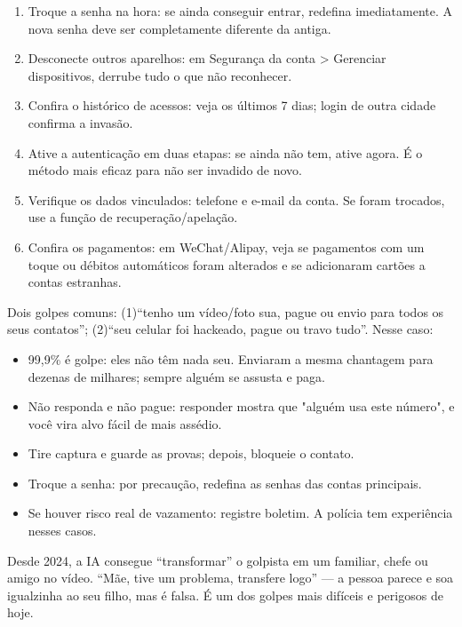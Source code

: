 
\begin{enumerate}
  \item Troque a senha na hora: se ainda conseguir entrar, redefina imediatamente. A nova senha deve ser completamente diferente da antiga.
  \item Desconecte outros aparelhos: em Segurança da conta > Gerenciar dispositivos, derrube tudo o que não reconhecer.
  \item Confira o histórico de acessos: veja os últimos 7 dias; login de outra cidade confirma a invasão.
  \item Ative a autenticação em duas etapas: se ainda não tem, ative agora. É o método mais eficaz para não ser invadido de novo.
  \item Verifique os dados vinculados: telefone e e-mail da conta. Se foram trocados, use a função de recuperação/apelação.
  \item Confira os pagamentos: em WeChat/Alipay, veja se pagamentos com um toque ou débitos automáticos foram alterados e se adicionaram cartões a contas estranhas.
\end{enumerate}


Dois golpes comuns: (1)“tenho um vídeo/foto sua, pague ou envio para todos os seus contatos”; (2)“seu celular foi hackeado, pague ou travo tudo”. Nesse caso:

\begin{itemize}
  \item 99,9\% é golpe: eles não têm nada seu. Enviaram a mesma chantagem para dezenas de milhares; sempre alguém se assusta e paga.
  \item Não responda e não pague: responder mostra que "alguém usa este número", e você vira alvo fácil de mais assédio.
  \item Tire captura e guarde as provas; depois, bloqueie o contato.
  \item Troque a senha: por precaução, redefina as senhas das contas principais.
  \item Se houver risco real de vazamento: registre boletim. A polícia tem experiência nesses casos.
\end{itemize}


Desde 2024, a IA consegue “transformar” o golpista em um familiar, chefe ou amigo no vídeo. “Mãe, tive um problema, transfere logo” — a pessoa parece e soa igualzinha ao seu filho, mas é falsa. É um dos golpes mais difíceis e perigosos de hoje.

